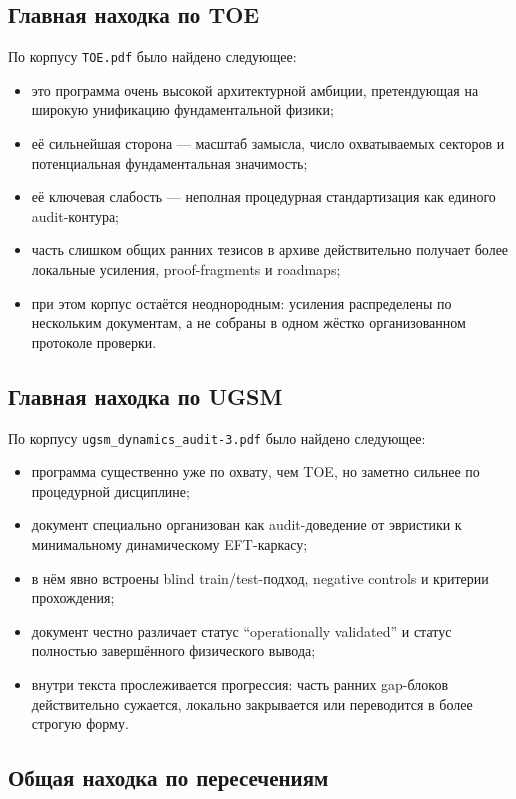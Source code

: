 \documentclass[12pt,a4paper]{article}
\begin{document}
\subsection{Главная находка по TOE}

По корпусу \texttt{TOE.pdf} было найдено следующее:
\begin{itemize}
    \item это программа очень высокой архитектурной амбиции, претендующая на широкую унификацию фундаментальной физики;
    \item её сильнейшая сторона --- масштаб замысла, число охватываемых секторов и потенциальная фундаментальная значимость;
    \item её ключевая слабость --- неполная процедурная стандартизация как единого audit-контура;
    \item часть слишком общих ранних тезисов в архиве действительно получает более локальные усиления, proof-fragments и roadmaps;
    \item при этом корпус остаётся неоднородным: усиления распределены по нескольким документам, а не собраны в одном жёстко организованном протоколе проверки.
\end{itemize}

\subsection{Главная находка по UGSM}

По корпусу \texttt{ugsm\_dynamics\_audit-3.pdf} было найдено следующее:
\begin{itemize}
    \item программа существенно уже по охвату, чем TOE, но заметно сильнее по процедурной дисциплине;
    \item документ специально организован как audit-доведение от эвристики к минимальному динамическому EFT-каркасу;
    \item в нём явно встроены blind train/test-подход, negative controls и критерии прохождения;
    \item документ честно различает статус ``operationally validated'' и статус полностью завершённого физического вывода;
    \item внутри текста прослеживается прогрессия: часть ранних gap-блоков действительно сужается, локально закрывается или переводится в более строгую форму.
\end{itemize}

\subsection{Общая находка по пересечениям}
\end{document}
